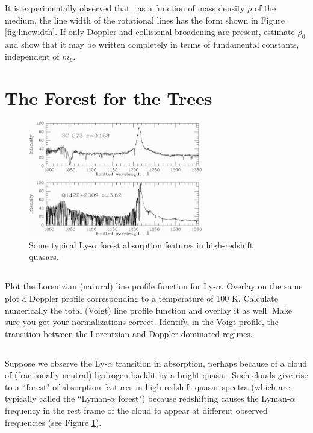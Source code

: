 \documentclass[11pt]{article}
\begin{document}
It is experimentally observed that , as a function of mass density $\rho$ of
the medium, the line width of the rotational lines has the form
shown in Figure \ref{fig:linewidth}.  If only Doppler and collisional broadening
are present, estimate $\rho_0$ and show that it may be written completely in
terms of fundamental constants, independent of $m_p$. 

\section{The Forest for the Trees}

\begin{figure}[!ht]\centering
\includegraphics[width=3in]{lya_forest.png}
\caption{
Some typical Ly-$\alpha$ forest absorption features in high-redshift quasars.
}\label{fig:lya_forest}
\end{figure}

\subsection{}
Plot the Lorentzian (natural) line profile function for Ly-$\alpha$.  Overlay on the same plot a Doppler
profile corresponding to a temperature of 100 K.  Calculate numerically the total (Voigt) line profile
function and overlay it as well.  Make sure you get your normalizations correct.  Identify, in the Voigt
profile, the transition between the Lorentzian and Doppler-dominated regimes.

\subsection{}
Suppose we observe the Ly-$\alpha$ transition in absorption, perhaps because of a cloud of (fractionally neutral)
hydrogen backlit by a bright quasar.  Such clouds give rise to a ``forest" of absorption features in
high-redshift quasar spectra (which are typically called the ``Lyman-$\alpha$ forest") because redshifting
causes the Lyman-$\alpha$ frequency in the rest frame of the cloud to appear at different observed
frequencies (see Figure \ref{fig:lya_forest}).
\end{document}
